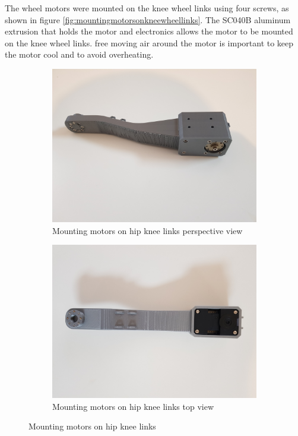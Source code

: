The wheel motors were mounted on the knee wheel links using four screws, as shown in figure \ref{fig:mountingmotorsonkneewheellinks}. The SC040B aluminum extrusion that holds the motor and electronics allows the motor to be mounted on the knee wheel links. free moving air around the motor is important to keep the motor cool and to avoid overheating.
\begin{figure}[h]
	\centering
	\begin{subfigure}[t]{0.45\textwidth}
		\includegraphics[height=0.7\textwidth]{mounting_motors_on_hip_knee_links_1}
		\caption{Mounting motors on hip knee links perspective view}
		\label{fig:mountingmotorsonhipkneelinksperspectiveview}
	\end{subfigure}
	\begin{subfigure}[t]{0.45\textwidth}
		\includegraphics[height=0.7\textwidth]{mounting_motors_on_hip_knee_links_2}
		\caption{Mounting motors on hip knee links top view}
		\label{fig:mountingmotorsonhipkneelinkstopview}
	\end{subfigure}
	\caption{Mounting motors on hip knee links}
	\label{fig:Mounting motors on hip knee links}
\end{figure}
